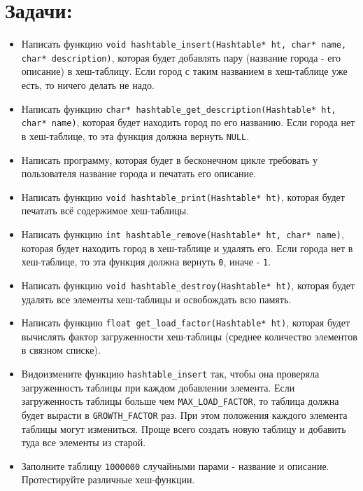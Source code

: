 \documentclass{article}
\begin{document}
\section*{Задачи:}
\begin{itemize}
\item Написать функцию \texttt{void hashtable\_insert(Hashtable* ht, char* name, char* description)}, которая будет добавлять пару (название города - его описание) в хеш-таблицу. Если город с таким названием в хеш-таблице уже есть, то ничего делать не надо.
\item Написать функцию \texttt{char* hashtable\_get\_description(Hashtable* ht, char* name)}, которая будет находить город по его названию. Если города нет в хеш-таблице, то эта функция должна вернуть \texttt{NULL}.
\item Написать программу, которая будет в бесконечном цикле требовать у пользователя название города и печатать его описание.
\item Написать функцию \texttt{void hashtable\_print(Hashtable* ht)}, которая будет печатать всё содержимое хеш-таблицы.
\item Написать функцию \texttt{int hashtable\_remove(Hashtable* ht, char* name)}, которая будет находить город в хеш-таблице и удалять его. Если города нет в хеш-таблице, то эта функция должна вернуть \texttt{0}, иначе - \texttt{1}.
\item Написать функцию \texttt{void hashtable\_destroy(Hashtable* ht)}, которая будет удалять все элементы хеш-таблицы и освобождать всю память.
\item Написать функцию \texttt{float get\_load\_factor(Hashtable* ht)}, которая будет вычислять фактор загруженности хеш-таблицы (среднее количество элементов в связном списке).
\item Видоизмените функцию \texttt{hashtable\_insert} так, чтобы она проверяла загруженность таблицы при каждом добавлении элемента. Если загруженность таблицы больше чем \texttt{MAX\_LOAD\_FACTOR}, то таблица должна будет вырасти в \texttt{GROWTH\_FACTOR} раз. При этом положения каждого элемента таблицы могут измениться. Проще всего создать новую таблицу и добавить туда все элементы из старой.
\item Заполните таблицу \texttt{1000000} случайными парами - название и описание. Протестируйте различные хеш-функции.
\end{itemize}
\end{document}
